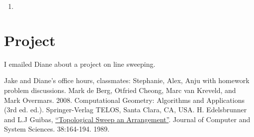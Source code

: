 \documentclass [12pt]{article}
\begin{document}
    \begin{enumerate}[label=\alph*.]
        \item 

       
    \end{enumerate}


    \pagebreak



    \section{Project}
    \label{sec:four}

    I emailed Diane about a project on line sweeping.

       
    
        




    




\begin{thebibliography}{1}
    Jake and Diane's office hours, classmates: Stephanie, Alex, Anju with homework problem discussions.
    Mark de Berg, Otfried Cheong, Marc van Kreveld, and Mark Overmars. 2008. Computational Geometry: Algorithms and Applications (3rd ed. ed.). Springer-Verlag TELOS, Santa Clara, CA, USA.
    H. Edelsbrunner and L.J Guibas, \href{https://www.sciencedirect.com/science/article/pii/002200008990038X}{``Topological Sweep an Arrangement''}. Journal of Computer and System Sciences. 38:164-194. 1989.
\end{thebibliography}
\end{document}

